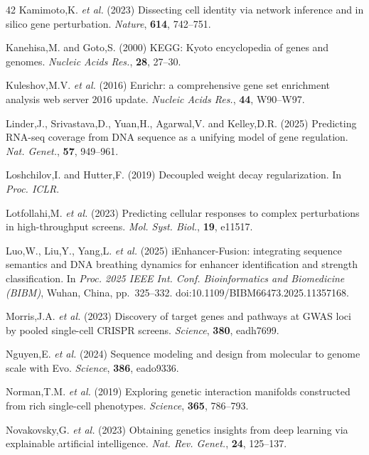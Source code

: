 \documentclass[12pt,a4paper]{article}
\begin{document}
\begin{thebibliography}{42}
Kamimoto,K. \textit{et al.} (2023) Dissecting cell identity via network inference and in silico gene perturbation. \textit{Nature}, \textbf{614}, 742--751.

Kanehisa,M. and Goto,S. (2000) KEGG: Kyoto encyclopedia of genes and genomes. \textit{Nucleic Acids Res.}, \textbf{28}, 27--30.

Kuleshov,M.V. \textit{et al.} (2016) Enrichr: a comprehensive gene set enrichment analysis web server 2016 update. \textit{Nucleic Acids Res.}, \textbf{44}, W90--W97.

Linder,J., Srivastava,D., Yuan,H., Agarwal,V. and Kelley,D.R. (2025) Predicting RNA-seq coverage from DNA sequence as a unifying model of gene regulation. \textit{Nat. Genet.}, \textbf{57}, 949--961.

Loshchilov,I. and Hutter,F. (2019) Decoupled weight decay regularization. In \textit{Proc. ICLR}.

Lotfollahi,M. \textit{et al.} (2023) Predicting cellular responses to complex perturbations in high-throughput screens. \textit{Mol. Syst. Biol.}, \textbf{19}, e11517.

Luo,W., Liu,Y., Yang,L. \textit{et al.} (2025) iEnhancer-Fusion: integrating sequence semantics and DNA breathing dynamics for enhancer identification and strength classification. In \textit{Proc. 2025 IEEE Int. Conf. Bioinformatics and Biomedicine (BIBM)}, Wuhan, China, pp.\ 325--332. doi:10.1109/BIBM66473.2025.11357168.

Morris,J.A. \textit{et al.} (2023) Discovery of target genes and pathways at GWAS loci by pooled single-cell CRISPR screens. \textit{Science}, \textbf{380}, eadh7699.

Nguyen,E. \textit{et al.} (2024) Sequence modeling and design from molecular to genome scale with Evo. \textit{Science}, \textbf{386}, eado9336.

Norman,T.M. \textit{et al.} (2019) Exploring genetic interaction manifolds constructed from rich single-cell phenotypes. \textit{Science}, \textbf{365}, 786--793.

Novakovsky,G. \textit{et al.} (2023) Obtaining genetics insights from deep learning via explainable artificial intelligence. \textit{Nat. Rev. Genet.}, \textbf{24}, 125--137.


\end{thebibliography}
\end{document}
